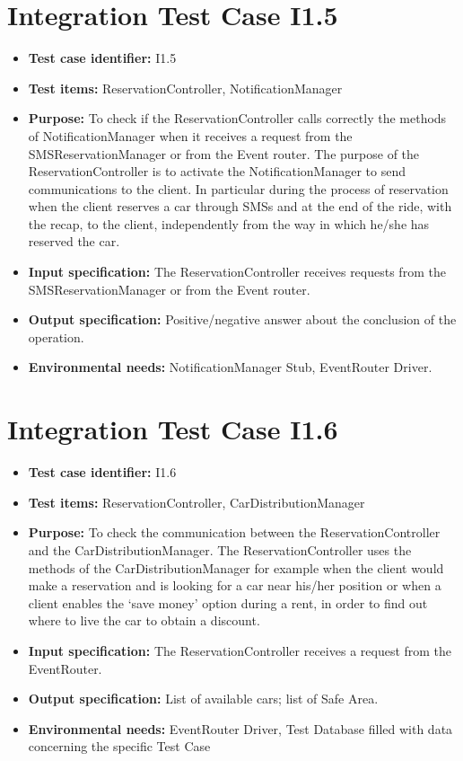 \section{Integration Test Case I1.5}
\begin{itemize}
\item \textbf{Test case identifier:} I1.5
\item \textbf{Test items:} ReservationController, NotificationManager
\item \textbf{Purpose:} To check if the ReservationController calls correctly the methods of NotificationManager when it receives a request from the SMSReservationManager or from the Event router. The purpose of the ReservationController is to activate the NotificationManager to send communications to the client. In particular during the process of reservation when the client reserves a car through SMSs and at the end of the ride, with the recap, to the client, independently from the way in which he/she has reserved the car.
\item \textbf{Input specification:} The ReservationController receives requests from the SMSReservationManager or from the Event router.
\item \textbf{Output specification:} Positive/negative answer about the conclusion of the operation.
\item \textbf{Environmental needs:} NotificationManager Stub,  EventRouter Driver.
\end{itemize}

\section{Integration Test Case I1.6}
\begin{itemize}
\item \textbf{Test case identifier:} I1.6
\item \textbf{Test items:} ReservationController, CarDistributionManager
\item \textbf{Purpose:} To check the communication between the ReservationController and the CarDistributionManager. The ReservationController uses the methods of the CarDistributionManager for example when the client would make a reservation and is looking for a car near his/her position or when a client enables the ‘save money’ option during a rent, in order to find out where to live the car to obtain a discount.
\item \textbf{Input specification:} The ReservationController receives a request from the EventRouter.
\item \textbf{Output specification:} List of available cars; list of Safe Area.
\item \textbf{Environmental needs:} EventRouter Driver, Test Database filled with data concerning the specific Test Case
\end{itemize}

